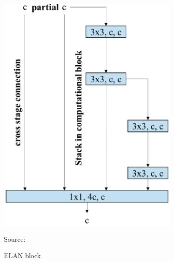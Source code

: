   \begin{figure}[p]
    \centering
    \begin{subfigure}[b]{.5\textwidth}
        \centering
        \includegraphics[width=.8\linewidth]{figures/elan-block.png}
        \caption*{Source: \textcite{yolov7}}
        \vspace{-2ex}
        \caption{ELAN block}
        \label{fig:elan-block}
    \end{subfigure}%
    \begin{subfigure}[b]{.5\textwidth}
        \centering

\end{subfigure}
\end{figure}
